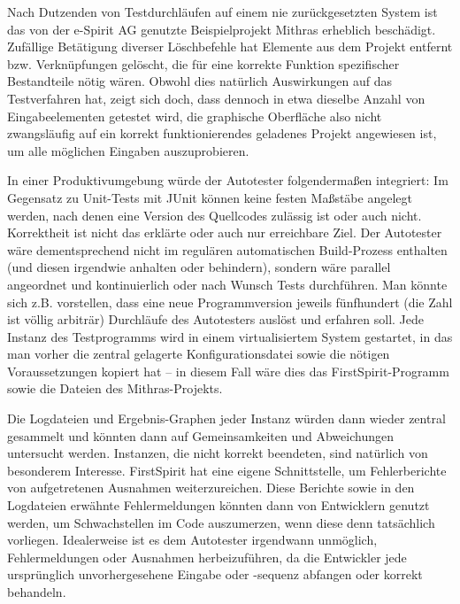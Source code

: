 Nach Dutzenden von Testdurchläufen auf einem nie zurückgesetzten System
ist das von der e-Spirit AG genutzte Beispielprojekt \glqq{}Mithras\grqq{}
erheblich beschädigt. Zufällige Betätigung diverser Löschbefehle hat
Elemente aus dem Projekt entfernt bzw. Verknüpfungen gelöscht, die für
eine korrekte Funktion spezifischer Bestandteile nötig wären. Obwohl
dies natürlich Auswirkungen auf das Testverfahren hat, zeigt sich doch,
dass dennoch in etwa dieselbe Anzahl von Eingabeelementen getestet wird,
die graphische Oberfläche also nicht zwangsläufig auf ein korrekt funktionierendes
geladenes Projekt angewiesen ist, um alle möglichen Eingaben auszuprobieren.

In einer Produktivumgebung würde der Autotester folgendermaßen integriert:
Im Gegensatz zu Unit-Tests mit JUnit können keine festen Maßstäbe angelegt
werden, nach denen eine Version des Quellcodes zulässig ist oder auch nicht.
Korrektheit ist nicht das erklärte oder auch nur erreichbare Ziel.
Der Autotester wäre dementsprechend nicht im regulären automatischen
Build-Prozess enthalten (und diesen irgendwie anhalten oder behindern),
sondern wäre parallel angeordnet und kontinuierlich oder nach Wunsch
Tests durchführen. Man könnte sich z.B. vorstellen, dass eine neue
Programmversion jeweils fünfhundert (die Zahl ist völlig arbiträr) Durchläufe
des Autotesters auslöst und erfahren soll. Jede Instanz des Testprogramms wird
in einem virtualisiertem System gestartet, in das man vorher die
zentral gelagerte Konfigurationsdatei sowie die nötigen Voraussetzungen
kopiert hat -- in diesem Fall wäre dies das FirstSpirit-Programm sowie
die Dateien des Mithras-Projekts.

Die Logdateien und Ergebnis-Graphen jeder Instanz würden dann wieder zentral
gesammelt und könnten dann auf Gemeinsamkeiten und Abweichungen untersucht
werden. Instanzen, die nicht korrekt beendeten, sind natürlich von besonderem
Interesse. FirstSpirit hat eine eigene Schnittstelle, um Fehlerberichte von
aufgetretenen Ausnahmen weiterzureichen. Diese Berichte sowie in den Logdateien
erwähnte Fehlermeldungen könnten dann von Entwicklern genutzt werden, um
Schwachstellen im Code auszumerzen, wenn diese denn tatsächlich vorliegen.
Idealerweise ist es dem Autotester irgendwann unmöglich, Fehlermeldungen
oder Ausnahmen herbeizuführen, da die Entwickler jede ursprünglich 
unvorhergesehene Eingabe oder -sequenz abfangen oder korrekt behandeln.


